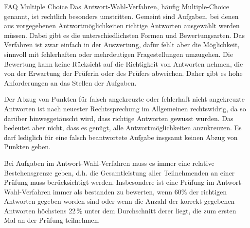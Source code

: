 \begin{artikel}{FAQ Multiple Choice}
Das Antwort-Wahl-Verfahren, häufig Multiple-Choice genannt, ist rechtlich besonders umstritten. Gemeint sind Aufgaben, bei denen aus vorgegebenen Antwortmöglichkeiten richtige Antworten ausgewählt werden müssen. Dabei gibt es die unterschiedlichsten Formen und Bewertungsarten. Das Verfahren ist zwar einfach in der Auswertung, dafür fehlt aber die Möglichkeit, sinnvoll mit fehlerhaften oder mehrdeutigen Fragestellungen umzugehen. Die Bewertung kann keine Rücksicht auf die Richtigkeit von Antworten nehmen, die von der Erwartung der Prüferin oder des Prüfers abweichen. Daher gibt es hohe Anforderungen an das Stellen der Aufgaben.


Der Abzug von Punkten für falsch angekreuzte oder fehlerhaft nicht angekreuzte Antworten ist nach neuester Rechtssprechung im Allgemeinen rechtswidrig, da so darüber hinweggetäuscht wird, dass richtige Antworten gewusst wurden. Das bedeutet aber nicht, dass es genügt, alle Antwortmöglichkeiten anzukreuzen. Es darf lediglich für eine falsch beantwortete Aufgabe insgsamt keinen Abzug von Punkten geben.

Bei Aufgaben im Antwort-Wahl-Verfahren muss es immer eine relative Bestehensgrenze geben, d.h. die Gesamtleistung aller Teilnehmenden an einer Prüfung muss berücksichtigt werden. Insbesondere ist eine Prüfung im Antwort-Wahl-Verfahren immer als bestanden zu bewerten, wenn 60\% der richtigen Antworten gegeben worden sind oder wenn die Anzahl der korrekt gegebenen Antworten höchstens 22\,\% unter dem Durchschnitt derer liegt, die zum ersten Mal an der Prüfung teilnehmen.
\end{artikel}
